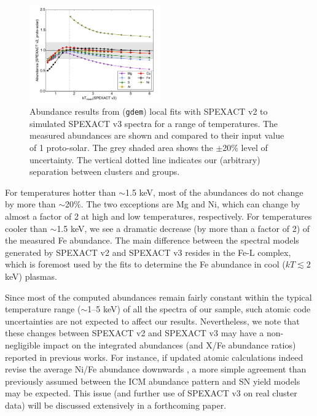 \documentclass{aa}
\begin{document}
\begin{figure}[!]

                \includegraphics[width=0.5\textwidth]{fig_SPEX2vs3.pdf}

        \caption{Abundance results from (\texttt{gdem}) local fits with SPEXACT v2 to simulated SPEXACT v3 spectra for a range of temperatures. The measured abundances are shown and compared to their input value of 1 proto-solar. The grey shaded area shows the $\pm$20\% level of uncertainty. The vertical dotted line indicates our (arbitrary) separation between clusters and groups.}
\label{fig:SPEX2vs3}
\end{figure}


For temperatures hotter than $\sim$1.5 keV, most of the abundances do not change by more than $\sim$20\%. The two exceptions are Mg and Ni, which can change by almost a factor of 2 at high and low temperatures, respectively. For temperatures cooler than $\sim$1.5 keV, we see a dramatic decrease (by more than a factor of 2) of the measured Fe abundance. The main difference between the spectral models generated by SPEXACT v2 and SPEXACT v3 resides in the Fe-L complex, which is foremost used by the fits to determine the Fe abundance in cool ($kT \lesssim 2$ keV) plasmas.

Since most of the computed abundances remain fairly constant within the typical temperature range ($\sim$1--5 keV) of all the spectra of our sample, such atomic code uncertainties are not expected to affect our results. Nevertheless, we note that these changes between SPEXACT v2 and SPEXACT v3 may have a non-negligible impact on the integrated abundances (and X/Fe abundance ratios) reported in previous works. For instance, if updated atomic calculations indeed revise the average Ni/Fe abundance downwards \citep[so far measured to be surprisingly high; e.g.][]{2016A&A...592A.157M,2016A&A...595A.126M}, a more simple agreement than previously assumed between the ICM abundance pattern and SN yield models may be expected. This issue (and further use of SPEXACT v3 on real cluster data) will be discussed extensively in a forthcoming paper.
\end{document}
